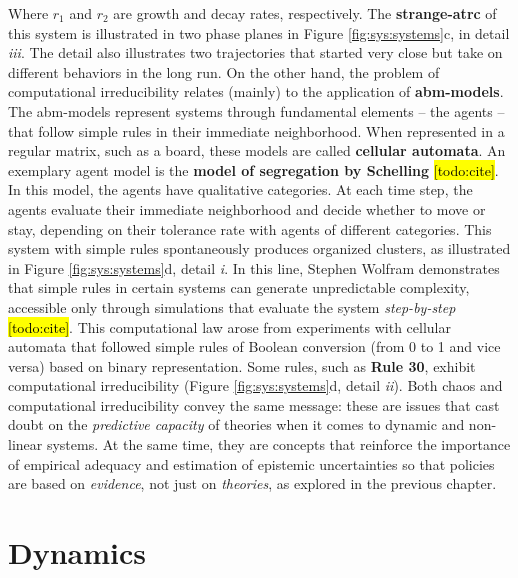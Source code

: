 \documentclass[./main_en.tex]{subfiles}
\begin{document}
Where $r_1$ and $r_2$ are growth and decay rates, respectively. The \textbf{\gls{strange-atrc}} of this \gls{system} is illustrated in two phase planes in Figure \ref{fig:sys:systems}c, in detail \textrm{\textit{iii}}. The detail also illustrates two trajectories that started very close but take on different behaviors in the long run. On the other hand, the problem of computational irreducibility relates (mainly) to the application of \textbf{\gls{abm-models}}. The \gls{abm-models} represent systems through fundamental elements – the agents – that follow simple rules in their immediate neighborhood. When represented in a regular matrix, such as a board, these models are called \textbf{cellular automata}. An exemplary agent \gls{model} is the \textbf{\gls{model} of segregation by Schelling} \hl{[todo:cite]}. In this \gls{model}, the agents have qualitative categories. At each time step, the agents evaluate their immediate neighborhood and decide whether to move or stay, depending on their tolerance rate with agents of different categories. This \gls{system} with simple rules spontaneously produces organized clusters, as illustrated in Figure \ref{fig:sys:systems}d, detail \textrm{\textit{i}}. In this line, Stephen Wolfram demonstrates that simple rules in certain systems can generate unpredictable complexity, accessible only through simulations that evaluate the \gls{system} \textit{step-by-step} \hl{[todo:cite]}. This computational law arose from experiments with cellular automata that followed simple rules of Boolean conversion (from 0 to 1 and vice versa) based on binary representation. Some rules, such as \textbf{Rule 30}, exhibit computational irreducibility (Figure \ref{fig:sys:systems}d, detail \textrm{\textit{ii}}). Both \gls{chaos} and computational irreducibility convey the same message: these are issues that cast doubt on the \textit{predictive capacity} of theories when it comes to dynamic and non-linear systems. At the same time, they are concepts that reinforce the importance of empirical adequacy and estimation of epistemic uncertainties so that policies are based on \textit{evidence}, not just on \textit{theories}, as explored in the previous chapter.


\section{Dynamics} \label{sec:sys:dynamics}
\end{document}
